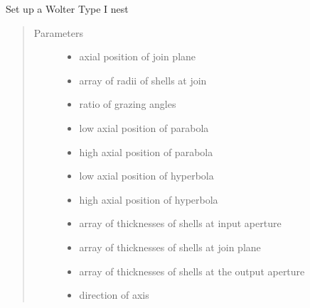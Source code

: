 \documentclass[letterpaper,10pt,english]{sphinxmanual}
\begin{document}
\begin{fulllineitems}
\label{\detokenize{xsrt_functions:xsrt.w1nest}}
Set up a Wolter Type I nest
\begin{quote}\begin{description}
\item[{Parameters}] \leavevmode\begin{itemize}
\item {} 
 \textendash{} axial position of join plane

\item {} 
 \textendash{} array of radii of shells at join

\item {} 
 \textendash{} ratio of grazing angles

\item {} 
 \textendash{} low axial position of parabola

\item {} 
 \textendash{} high axial position of parabola

\item {} 
 \textendash{} low axial position of hyperbola

\item {} 
 \textendash{} high axial position of hyperbola

\item {} 
 \textendash{} array of thicknesses of shells at input aperture

\item {} 
 \textendash{} array of thicknesses of shells at join plane

\item {} 
 \textendash{} array of thicknesses of shells at the output aperture

\item {} 
 \textendash{} direction of axis


\end{itemize}
\end{description}
\end{quote}
\end{fulllineitems}
\end{document}
